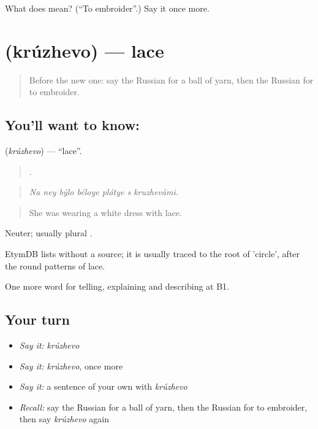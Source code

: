 \begin{tcolorbox}[breakable,colback=teal!4,colframe=teal!35!black,title={Before you move on}]
What does  mean? (\textquotedblleft{}To embroider\textquotedblright{}.) Say it once more.
\end{tcolorbox}
\section[\texorpdfstring{\ru{кружево} (krúzhevo)}{кружево (krúzhevo)}]{ (krúzhevo) — lace}

\label{lesson:RU-C500-kruzhevo}



\begin{quote}
Before the new one: say the Russian for a ball of yarn, then the Russian for to embroider.
\end{quote}

\subsection*{You'll want to know: }
\textbf{} (\emph{krúzhevo}) — \textquotedblleft{}lace\textquotedblright{}.

\begin{quote}
      .
\end{quote}

\begin{quote}
\emph{Na ney býlo béloye plátye s kruzhevámi.}
\end{quote}

\begin{quote}
She was wearing a white dress with lace.
\end{quote}

Neuter; usually plural \emph{}.

\begin{cousinweb}
EtymDB lists \emph{} without a source; it is usually traced to the root of \emph{} 'circle', after the round patterns of lace.
\end{cousinweb}

\begin{grammarlens}[title={What you've built}]
One more word for telling, explaining and describing at B1.
\end{grammarlens}

\subsection*{Your turn}
\begin{itemize}
\raggedright
  \item \emph{Say it:} \emph{krúzhevo}
  \item \emph{Say it:} \emph{krúzhevo}, once more
  \item \emph{Say it:} a sentence of your own with \emph{krúzhevo}
  \item \emph{Recall:} say the Russian for a ball of yarn, then the Russian for to embroider, then say \emph{krúzhevo} again
\end{itemize}

